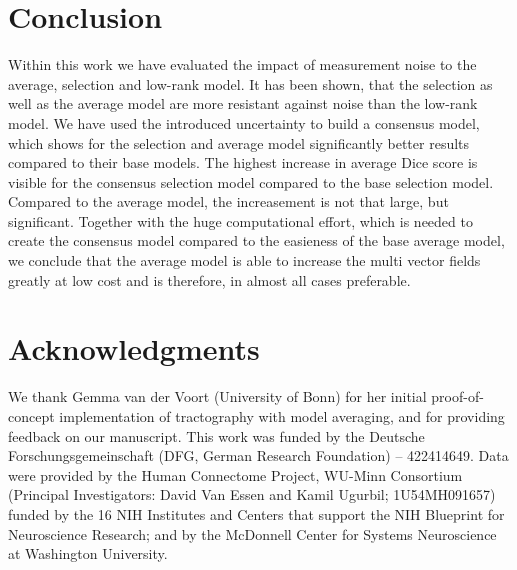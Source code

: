 \section{Conclusion}
\label{sec:conclusion}
Within this work we have evaluated the impact of measurement noise to the
average, selection and low-rank model. It has been shown, that the selection as
well as the average model are more resistant against noise than the low-rank
model. 
We have used the introduced uncertainty
to build a consensus model, which shows for the selection and average model
significantly better results compared to their base models. 
The highest increase in average Dice score is visible for the consensus
selection model compared to the base selection model. Compared to the average
model, the increasement is not that large, but significant. Together with the
huge computational effort, which is needed to create the consensus model
compared to the easieness of the base average model, we conclude that the
average model is able to increase the multi vector fields greatly at low cost
and is therefore, in almost all cases preferable. 

\section*{Acknowledgments}

We thank Gemma van der Voort (University of Bonn) for her initial proof-of-concept implementation of tractography with model averaging, and for providing feedback on our manuscript. This work was funded by the Deutsche Forschungsgemeinschaft (DFG, German Research Foundation) -- 422414649.
Data were provided by the Human Connectome Project, WU-Minn Consortium (Principal Investigators: David Van Essen and Kamil Ugurbil; 1U54MH091657) funded by the 16 NIH Institutes and Centers that support the NIH Blueprint
for Neuroscience Research; and by the McDonnell Center for Systems Neuroscience at Washington University.